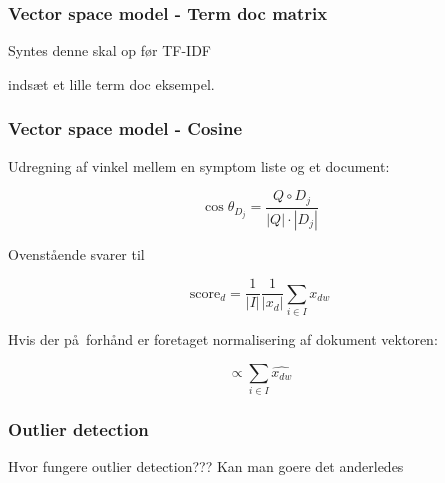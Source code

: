\documentclass[xcolor=table]{beamer}
\begin{document}
\begin{frame}

  \frametitle{Vector space model - Term doc matrix}

  Syntes denne skal op f\o r TF-IDF



  inds\ae t et lille term doc eksempel.

\end{frame}

\begin{frame}

  \frametitle{Vector space model - Cosine}

  Udregning af vinkel mellem en symptom liste og et document:
  
  \[
  \cos \theta_{D_j} = \frac{Q \circ D_j}{|Q| \cdot |D_j|}
  \]
  
  Ovenst\aa ende svarer til
  
  \[
  \textrm{score}_{d} = \frac{1}{|I|}\frac{1}{|x_{d}|} \sum_{i \in I} x_{dw}
  \]
  
  Hvis der p\aa\ forh\aa nd er foretaget normalisering af dokument vektoren:
  
  \[
  \propto  \sum_{i \in I} \widehat{x_{dw}}
  \]
  
\end{frame}

\begin{frame}

  \frametitle{Outlier detection}

  Hvor fungere outlier detection??? Kan man goere det anderledes

\end{frame}
\end{document}
